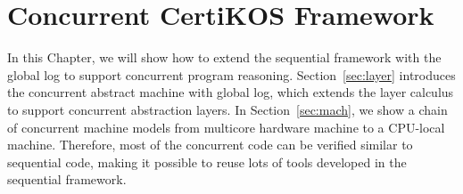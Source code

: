 \chapter{Concurrent CertiKOS Framework}
\label{chap:con}

In this Chapter, we will show how to
extend the sequential \CTOS{} framework
with the global log
to support concurrent program reasoning.
Section~\ref{sec:layer} introduces
the concurrent abstract machine with
global log, which extends the layer calculus
to support concurrent abstraction layers.
In Section~\ref{sec:mach},
we show a chain of concurrent
machine models from
multicore hardware machine
to a CPU-local machine.
Therefore,  most of the concurrent code
can be verified similar to sequential code,
making it possible to reuse lots of tools
developed in the sequential \CTOS{} framework.


